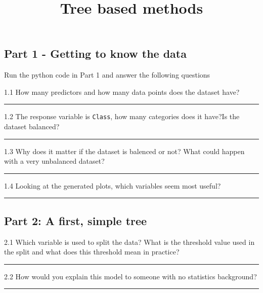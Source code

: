 \documentclass[
  a4paper,
  DIV=11,
  numbers=noendperiod]{scrartcl}
\title{Tree based methods}
\author{}
\date{}
\begin{document}
\maketitle


\subsection{Part 1 - Getting to know the
data}\label{part-1---getting-to-know-the-data}

Run the python code in Part 1 and answer the following questions

1.1 How many predictors and how many data points does the dataset have?

\begin{center}\rule{0.5\linewidth}{0.5pt}\end{center}

1.2 The response variable is \texttt{Class}, how many categories does it
have?Is the dataset balanced?

\begin{center}\rule{0.5\linewidth}{0.5pt}\end{center}

1.3 Why does it matter if the dataset is balenced or not? What could
happen with a very unbalanced dataset?

\begin{center}\rule{0.5\linewidth}{0.5pt}\end{center}

1.4 Looking at the generated plots, which variables seem most useful?

\begin{center}\rule{0.5\linewidth}{0.5pt}\end{center}

\subsection{Part 2: A first, simple
tree}\label{part-2-a-first-simple-tree}

2.1 Which variable is used to split the data? What is the threshold
value used in the split and what does this threshold mean in practice?

\begin{center}\rule{0.5\linewidth}{0.5pt}\end{center}

2.2 How would you explain this model to someone with no statistics
background?

\begin{center}\rule{0.5\linewidth}{0.5pt}\end{center}
\end{document}
